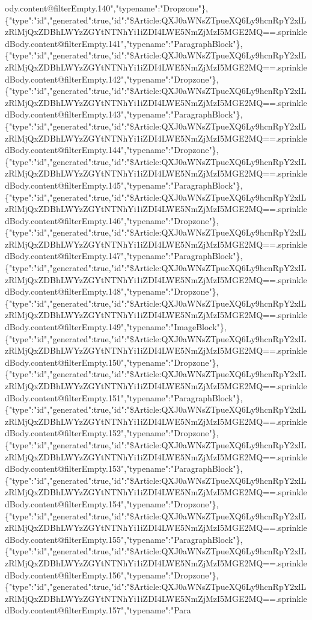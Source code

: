 ody.content@filterEmpty.140","typename":"Dropzone"\},\{"type":"id","generated":true,"id":"\$Article:QXJ0aWNsZTpueXQ6Ly9hcnRpY2xlLzRlMjQxZDBhLWYzZGYtNTNhYi1iZDI4LWE5NmZjMzI5MGE2MQ==.sprinkledBody.content@filterEmpty.141","typename":"ParagraphBlock"\},\{"type":"id","generated":true,"id":"\$Article:QXJ0aWNsZTpueXQ6Ly9hcnRpY2xlLzRlMjQxZDBhLWYzZGYtNTNhYi1iZDI4LWE5NmZjMzI5MGE2MQ==.sprinkledBody.content@filterEmpty.142","typename":"Dropzone"\},\{"type":"id","generated":true,"id":"\$Article:QXJ0aWNsZTpueXQ6Ly9hcnRpY2xlLzRlMjQxZDBhLWYzZGYtNTNhYi1iZDI4LWE5NmZjMzI5MGE2MQ==.sprinkledBody.content@filterEmpty.143","typename":"ParagraphBlock"\},\{"type":"id","generated":true,"id":"\$Article:QXJ0aWNsZTpueXQ6Ly9hcnRpY2xlLzRlMjQxZDBhLWYzZGYtNTNhYi1iZDI4LWE5NmZjMzI5MGE2MQ==.sprinkledBody.content@filterEmpty.144","typename":"Dropzone"\},\{"type":"id","generated":true,"id":"\$Article:QXJ0aWNsZTpueXQ6Ly9hcnRpY2xlLzRlMjQxZDBhLWYzZGYtNTNhYi1iZDI4LWE5NmZjMzI5MGE2MQ==.sprinkledBody.content@filterEmpty.145","typename":"ParagraphBlock"\},\{"type":"id","generated":true,"id":"\$Article:QXJ0aWNsZTpueXQ6Ly9hcnRpY2xlLzRlMjQxZDBhLWYzZGYtNTNhYi1iZDI4LWE5NmZjMzI5MGE2MQ==.sprinkledBody.content@filterEmpty.146","typename":"Dropzone"\},\{"type":"id","generated":true,"id":"\$Article:QXJ0aWNsZTpueXQ6Ly9hcnRpY2xlLzRlMjQxZDBhLWYzZGYtNTNhYi1iZDI4LWE5NmZjMzI5MGE2MQ==.sprinkledBody.content@filterEmpty.147","typename":"ParagraphBlock"\},\{"type":"id","generated":true,"id":"\$Article:QXJ0aWNsZTpueXQ6Ly9hcnRpY2xlLzRlMjQxZDBhLWYzZGYtNTNhYi1iZDI4LWE5NmZjMzI5MGE2MQ==.sprinkledBody.content@filterEmpty.148","typename":"Dropzone"\},\{"type":"id","generated":true,"id":"\$Article:QXJ0aWNsZTpueXQ6Ly9hcnRpY2xlLzRlMjQxZDBhLWYzZGYtNTNhYi1iZDI4LWE5NmZjMzI5MGE2MQ==.sprinkledBody.content@filterEmpty.149","typename":"ImageBlock"\},\{"type":"id","generated":true,"id":"\$Article:QXJ0aWNsZTpueXQ6Ly9hcnRpY2xlLzRlMjQxZDBhLWYzZGYtNTNhYi1iZDI4LWE5NmZjMzI5MGE2MQ==.sprinkledBody.content@filterEmpty.150","typename":"Dropzone"\},\{"type":"id","generated":true,"id":"\$Article:QXJ0aWNsZTpueXQ6Ly9hcnRpY2xlLzRlMjQxZDBhLWYzZGYtNTNhYi1iZDI4LWE5NmZjMzI5MGE2MQ==.sprinkledBody.content@filterEmpty.151","typename":"ParagraphBlock"\},\{"type":"id","generated":true,"id":"\$Article:QXJ0aWNsZTpueXQ6Ly9hcnRpY2xlLzRlMjQxZDBhLWYzZGYtNTNhYi1iZDI4LWE5NmZjMzI5MGE2MQ==.sprinkledBody.content@filterEmpty.152","typename":"Dropzone"\},\{"type":"id","generated":true,"id":"\$Article:QXJ0aWNsZTpueXQ6Ly9hcnRpY2xlLzRlMjQxZDBhLWYzZGYtNTNhYi1iZDI4LWE5NmZjMzI5MGE2MQ==.sprinkledBody.content@filterEmpty.153","typename":"ParagraphBlock"\},\{"type":"id","generated":true,"id":"\$Article:QXJ0aWNsZTpueXQ6Ly9hcnRpY2xlLzRlMjQxZDBhLWYzZGYtNTNhYi1iZDI4LWE5NmZjMzI5MGE2MQ==.sprinkledBody.content@filterEmpty.154","typename":"Dropzone"\},\{"type":"id","generated":true,"id":"\$Article:QXJ0aWNsZTpueXQ6Ly9hcnRpY2xlLzRlMjQxZDBhLWYzZGYtNTNhYi1iZDI4LWE5NmZjMzI5MGE2MQ==.sprinkledBody.content@filterEmpty.155","typename":"ParagraphBlock"\},\{"type":"id","generated":true,"id":"\$Article:QXJ0aWNsZTpueXQ6Ly9hcnRpY2xlLzRlMjQxZDBhLWYzZGYtNTNhYi1iZDI4LWE5NmZjMzI5MGE2MQ==.sprinkledBody.content@filterEmpty.156","typename":"Dropzone"\},\{"type":"id","generated":true,"id":"\$Article:QXJ0aWNsZTpueXQ6Ly9hcnRpY2xlLzRlMjQxZDBhLWYzZGYtNTNhYi1iZDI4LWE5NmZjMzI5MGE2MQ==.sprinkledBody.content@filterEmpty.157","typename":"Para